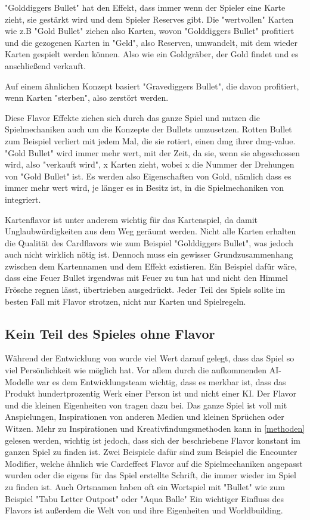 "Golddiggers Bullet" hat den Effekt, dass immer wenn der Spieler eine Karte zieht, sie gestärkt wird und dem Spieler Reserves gibt. Die "wertvollen" Karten wie z.B "Gold Bullet" ziehen also Karten, wovon "Golddiggers Bullet" profitiert und die
gezogenen Karten in "Geld", also Reserven, umwandelt, mit dem wieder Karten gespielt werden können. Also wie ein Goldgräber, der Gold findet und es anschließend verkauft.

Auf einem ähnlichen Konzept basiert "Gravediggers Bullet", die davon profitiert, wenn Karten "sterben", also zerstört werden.


Diese Flavor Effekte ziehen sich durch das ganze Spiel und nutzen die Spielmechaniken auch um die Konzepte der Bullets umzusetzen.
Rotten Bullet zum Beispiel verliert mit jedem Mal, die sie rotiert, einen dmg ihrer dmg-value. "Gold Bullet" wird immer mehr
wert, mit der Zeit, da sie, wenn sie abgeschossen wird, also "verkauft wird", x Karten zieht, wobei x die Nummer der Drehungen
von "Gold Bullet" ist. Es werden also Eigenschaften von Gold, nämlich dass es immer mehr wert wird, je länger es in Besitz ist,
in die Spielmechaniken von \FF integriert.


Kartenflavor ist unter anderem wichtig für das Kartenspiel, da damit Unglaubwürdigkeiten aus dem Weg geräumt werden.
Nicht alle Karten erhalten die Qualität des Cardflavors wie zum Beispiel "Golddiggers Bullet", was jedoch auch nicht wirklich nötig ist.
Dennoch muss ein gewisser Grundzusammenhang zwischen dem Kartennamen und dem Effekt existieren.
Ein Beispiel dafür wäre, dass eine Feuer Bullet irgendwas mit Feuer zu tun hat und nicht den Himmel Frösche regnen lässt,
übertrieben ausgedrückt. Jeder Teil des Spiels sollte im besten Fall mit Flavor strotzen, nicht nur Karten und Spielregeln.



\subsection{Kein Teil des Spieles ohne Flavor}\label{subsec:keinTeildesSpielesOhneFlavor}

Während der Entwicklung von \FF wurde viel Wert darauf gelegt, dass das Spiel so viel Persönlichkeit wie möglich hat.
Vor allem durch die aufkommenden AI-Modelle war es dem Entwicklungsteam wichtig, dass es merkbar ist,
dass das Produkt hundertprozentig Werk einer Person ist und nicht einer KI.
Der Flavor und die kleinen Eigenheiten von \FF tragen dazu bei.
Das ganze Spiel ist voll mit Anspielungen, Inspirationen von anderen Medien und kleinen Sprüchen oder Witzen. Mehr zu Inspirationen und Kreativfindungsmethoden
kann in \ref{methoden} gelesen werden, wichtig ist jedoch, dass sich der beschriebene Flavor konstant im ganzen Spiel zu finden ist.
Zwei Beispiele dafür sind zum Beispiel die Encounter Modifier, welche ähnlich wie Cardeffect Flavor auf die Spielmechaniken
angepasst wurden oder die eigens für das Spiel erstellte Schrift, die immer wieder im Spiel zu finden ist. Auch Ortsnamen
haben oft ein Wortspiel mit "Bullet" wie zum Beispiel "Tabu Letter Outpost" oder "Aqua Balle"
Ein wichtiger Einfluss des Flavors ist außerdem die Welt von \FF und ihre Eigenheiten und Worldbuilding.



